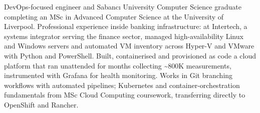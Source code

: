 



DevOps-focused engineer and Sabancı University Computer Science graduate completing an MSc in Advanced Computer Science at the University of Liverpool. Professional experience inside banking infrastructure: at Intertech, a systems integrator serving the finance sector, managed high-availability Linux and Windows servers and automated VM inventory across Hyper-V and VMware with Python and PowerShell. Built, containerised and provisioned as code a cloud platform that ran unattended for months collecting \textasciitilde 800K measurements, instrumented with Grafana for health monitoring. Works in Git branching workflows with automated pipelines; Kubernetes and container-orchestration fundamentals from MSc Cloud Computing coursework, transferring directly to OpenShift and Rancher.




